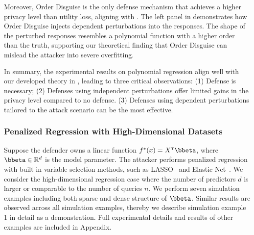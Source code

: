     Moreover, Order Disguise is the only defense mechanism that achieves a higher privacy level than utility loss, aligning with . The left panel in  demonstrates how Order Disguise injects dependent perturbations into the responses. The shape of the perturbed responses resembles a polynomial function with a higher order than the truth, supporting our theoretical finding that Order Disguise can mislead the attacker into severe overfitting. 

    In summary, the experimental results on polynomial regression align well with our developed theory in , leading to three critical observations: (1) Defense is necessary; (2) Defenses using independent perturbations offer limited gains in the privacy level compared to no defense. (3) Defenses using dependent perturbations tailored to the attack scenario can be the most effective.

    \subsubsection{Penalized Regression with High-Dimensional Datasets}\label{subsub:high_dim}
        Suppose the defender owns a linear function $\fd(x) = \X^\T \bbeta$, where $\bbeta \in \Real^d$ is the model parameter. The attacker performs penalized regression with built-in variable selection methods, such as LASSO~\citep{tibshirani1996regression} and Elastic Net~\citep{zou2005regularization}. We consider the high-dimensional regression case where the number of predictors $d$ is larger or comparable to the number of queries $n$. We perform seven simulation examples including both sparse and dense structure of $\bbeta$. Similar results are observed across all simulation examples, thereby we describe simulation example 1 in detail as a demonstration. Full experimental details and results of other examples are included in Appendix. 

